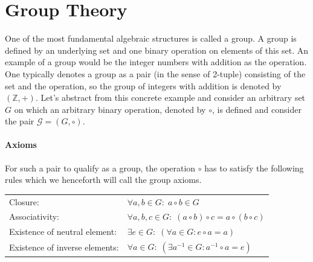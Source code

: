 \section{Group Theory}  %
One of the most fundamental algebraic structures is called a group. A group is defined by an underlying set and one binary operation on elements of this set. An example of a group would be the integer numbers with addition as the operation. One typically denotes a group as a pair (in the sense of 2-tuple) consisting of the set and the operation, so the group of integers with addition is denoted by $(\mathbb{Z},+)$. Let's abstract from this concrete example and consider an arbitrary set $G$ on which an arbitrary binary operation, denoted by $\circ$, is defined and consider the pair $\mathcal{G} = (G,\circ)$. 

\paragraph{Axioms}      
For such a pair to qualify as a group, the operation $\circ$ has to satisfy the following rules which we henceforth will call the group axioms.

\medskip
\begin{tabular}{l l}
Closure: 
& $\forall a,b \in G: \; a \circ b \in G$  \\	
Associativity: 
& $\forall a,b,c \in G: \;  (a \circ b) \circ c = a \circ (b \circ c)$   \\
Existence of neutral element: 
& $\exists e \in G: \; (\forall a \in G: e \circ a = a)$ \\
Existence of inverse elements: 
& $\forall a \in G: \; (\exists a^{-1} \in G: a^{-1} \circ a = e )$ \\
\end{tabular}
\medskip

